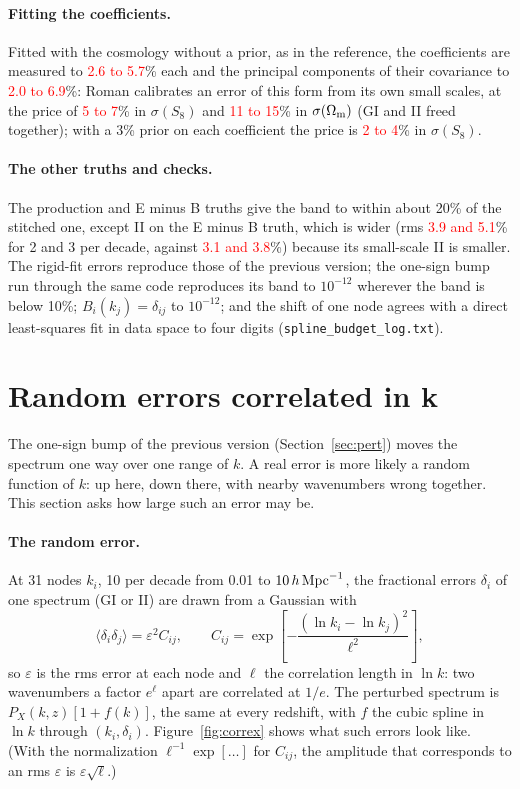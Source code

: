 \documentclass[11pt]{article}
\newcommand{\hMpc}{\,h\,{\rm Mpc}^{-1}}
\newcommand{\Om}{\Omega_{\rm m}}
\newif\ifnumbersfinal
\newcommand{\refresh}[1]{\ifnumbersfinal#1\else\textcolor{red}{#1}\fi}
\newcommand{\SplNoCutRmsII}{\refresh{3.1 and 3.8}}
\newcommand{\SplFreeSNoCut}{\refresh{5 to 7}}
\newcommand{\SplFreeOmNoCut}{\refresh{11 to 15}}
\newcommand{\SplFreeSNoCutThree}{\refresh{2 to 4}}
\newcommand{\SplSigPNoCut}{\refresh{2.6 to 5.7}}
\newcommand{\SplPCNoCut}{\refresh{2.0 to 6.9}}
\newcommand{\SplEBRmsII}{\refresh{3.9 and 5.1}}
\begin{document}
\paragraph{Fitting the coefficients.}
Fitted with the cosmology without a prior, as in the reference, the
coefficients are measured to \SplSigPNoCut\% each and the principal
components of their covariance to \SplPCNoCut\%: Roman calibrates an error of
this form from its own small scales, at the price of \SplFreeSNoCut\% in
$\sigma(S_8)$ and \SplFreeOmNoCut\% in $\sigma(\Om)$ (GI and II freed
together); with a 3\% prior on each coefficient the price is
\SplFreeSNoCutThree\% in $\sigma(S_8)$.

\paragraph{The other truths and checks.}
The production and E minus B truths give the band to within about 20\% of
the stitched one, except II on the E minus B truth, which is wider (rms
\SplEBRmsII\% for 2 and 3 per decade, against \SplNoCutRmsII\%) because its
small-scale II is smaller. The rigid-fit errors reproduce those of the
previous version; the one-sign bump run through the same code reproduces its
band to $10^{-12}$ wherever the band is below 10\%; $B_i(k_j) = \delta_{ij}$
to $10^{-12}$; and the shift of one node agrees with a direct least-squares
fit in data space to four digits (\texttt{spline\_budget\_log.txt}).

\section{Random errors correlated in k}
\label{sec:corr}

The one-sign bump of the previous version (Section~\ref{sec:pert}) moves the
spectrum one way over one range of $k$. A real error is more likely a random function of $k$: up here,
down there, with nearby wavenumbers wrong together. This section asks how
large such an error may be.

\paragraph{The random error.}
At 31 nodes $k_i$, 10 per decade from 0.01 to $10\hMpc$, the fractional
errors $\delta_i$ of one spectrum (GI or II) are drawn from a Gaussian with
\begin{equation}
  \langle \delta_i \delta_j \rangle = \varepsilon^2 C_{ij},\qquad
  C_{ij} = \exp\!\left[-\frac{(\ln k_i - \ln k_j)^2}{\ell^2}\right],
  \label{eq:corr}
\end{equation}
so $\varepsilon$ is the rms error at each node and $\ell$ the correlation
length in $\ln k$: two wavenumbers a factor $e^{\ell}$ apart are correlated
at $1/e$. The perturbed spectrum is $P_X(k, z)[1 + f(k)]$, the same at every
redshift, with $f$ the cubic spline in $\ln k$ through $(k_i, \delta_i)$.
Figure~\ref{fig:correx} shows what such errors look like. (With the
normalization $\ell^{-1}\exp[\ldots]$ for $C_{ij}$, the amplitude that
corresponds to an rms $\varepsilon$ is $\varepsilon\sqrt{\ell}$.)
\end{document}
